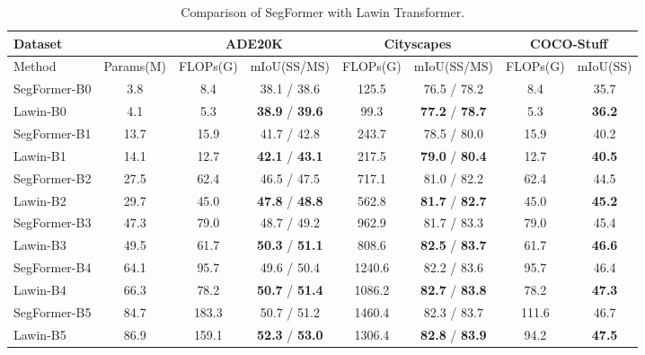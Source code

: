 \documentclass[10pt,twocolumn,letterpaper]{article}
\begin{document}
\begin{table*}
\small
  \centering
  \renewcommand\arraystretch{1.15}
  
  \begin{tabular}{l|c|cc|cc|cc} \hline
  
  \hline

  \small{Dataset} & & \multicolumn{2}{c|}{ADE20K}& \multicolumn{2}{c|}{Cityscapes}& \multicolumn{2}{c}{COCO-Stuff} \\
  \hline
  \small{Method}  & Params(M) & FLOPs(G) & mIoU(SS/MS) & FLOPs(G) & mIoU(SS/MS) & FLOPs(G) & mIoU(SS) \\
\hline
  SegFormer-B0  & 3.8 & 8.4 & 38.1 / 38.6 & 125.5 & 76.5 / 78.2 &  8.4 & 35.7  \\
  Lawin-B0  & 4.1 & 5.3 & \textbf{38.9} / \textbf{39.6}\textbf{} & 99.3 & \textbf{77.2} / \textbf{78.7} & 5.3 &  \textbf{36.2} \\
  \hline
  SegFormer-B1  & 13.7 & 15.9  & 41.7 / 42.8 &  243.7 & 78.5 / 80.0  & 15.9 &  40.2 \\
  Lawin-B1  & 14.1 & 12.7 & \textbf{42.1} / \textbf{43.1}  & 217.5 & \textbf{79.0} / \textbf{80.4} & 12.7  &  \textbf{40.5}  \\
  \hline
  SegFormer-B2 & 27.5 & 62.4 & 46.5 / 47.5 & 717.1 & 81.0 / 82.2 & 62.4 & 44.5\\
  Lawin-B2  & 29.7 & 45.0&  \textbf{47.8} / \textbf{48.8} & 562.8 &  \textbf{81.7} / \textbf{82.7} & 45.0 & \textbf{45.2}\\
  \hline
  SegFormer-B3  & 47.3 & 79.0 & 48.7 / 49.2 & 962.9 &81.7 / 83.3  & 79.0 & 45.4\\
  Lawin-B3  & 49.5 & 61.7 & \textbf{50.3} / \textbf{51.1}& 808.6 &\textbf{82.5} / \textbf{83.7} & 61.7 & \textbf{46.6} \\
  \hline
   SegFormer-B4  & 64.1 & 95.7 & 49.6 / 50.4 & 1240.6 &82.2 / 83.6 & 95.7 & 46.4\\
  Lawin-B4  & 66.3 & 78.2 & \textbf{50.7} / \textbf{51.4} &1086.2 &\textbf{82.7} / \textbf{83.8}&78.2 & \textbf{47.3} \\
  \hline
   SegFormer-B5  & 84.7 & 183.3 & 50.7 / 51.2 & 1460.4 &82.3 / 83.7 & 111.6 & 46.7 \\
  Lawin-B5  & 86.9 & 159.1 & \textbf{52.3} / \textbf{53.0} & 1306.4 & \textbf{82.8} / \textbf{83.9} & 94.2& \textbf{47.5} \\
  \hline
  
  
  \hline
  
  \end{tabular}
  \caption{Comparison of SegFormer with Lawin Transformer.}
  \label{tab:seg}
\end{table*}
\end{document}
